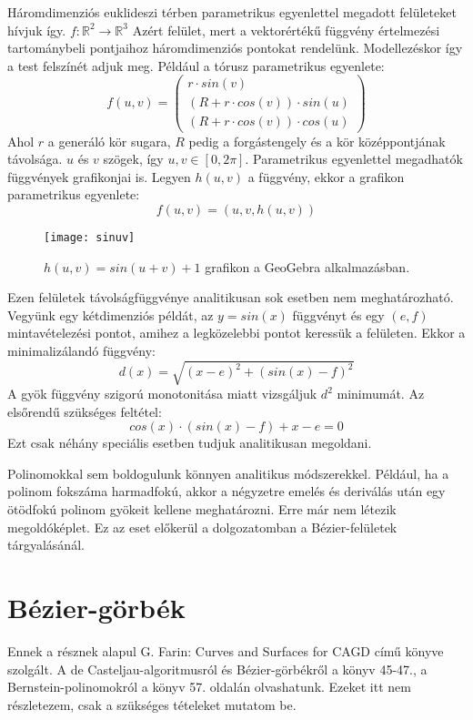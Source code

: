 Háromdimenziós euklideszi térben parametrikus egyenlettel megadott felületeket hívjuk így. $f:\mathbb{R}^2\rightarrow\mathbb{R}^3$ Azért felület, mert a vektorértékű függvény értelmezési tartománybeli pontjaihoz háromdimenziós pontokat rendelünk. Modellezéskor így a test felszínét adjuk meg.  Például a tórusz parametrikus egyenlete:
$$ f(u,v) = \begin{pmatrix} 
	r\cdot sin(v) \\ 
	(R+r\cdot cos(v))\cdot sin(u) \\ 
	(R+r\cdot cos(v))\cdot cos(u)
\end{pmatrix} $$
Ahol $r$ a generáló kör sugara, $R$ pedig a forgástengely és a kör középpontjának távolsága. $u$ és $v$ szögek, így $u,v\in[0,2\pi]$.  
Parametrikus egyenlettel megadhatók függvények grafikonjai is. Legyen $h(u,v)$ a függvény, ekkor a grafikon parametrikus egyenlete:
$$ f(u,v) = (u,v,h(u,v)) $$
\begin{figure}[H]
	\centering
	\texttt{[image: sinuv]}
	\caption{$h(u,v) = sin(u+v)+1$ grafikon a GeoGebra alkalmazásban.}
\end{figure}

Ezen felületek távolságfüggvénye analitikusan sok esetben nem meghatározható. Vegyünk egy kétdimenziós példát, az $y = sin(x)$ függvényt és egy $(e,f)$ mintavételezési pontot, amihez a legközelebbi pontot keressük a felületen. Ekkor a minimalizálandó függvény: 
$$ d(x) = \sqrt{(x-e)^2+(sin(x)-f)^2} $$
A gyök függvény szigorú monotonitása miatt vizsgáljuk $d^2$ minimumát. Az elsőrendű szükséges feltétel: 
$$ cos(x)\cdot(sin(x)-f)+x-e = 0 $$ 
Ezt csak néhány speciális esetben tudjuk analitikusan megoldani.

Polinomokkal sem boldogulunk könnyen analitikus módszerekkel. Például, ha a polinom fokszáma harmadfokú, akkor a négyzetre emelés és deriválás után egy ötödfokú polinom gyökeit kellene meghatározni. Erre már nem létezik megoldóképlet. Ez az eset előkerül a dolgozatomban a Bézier-felületek tárgyalásánál.


\section{Bézier-görbék}

Ennek a résznek alapul G. Farin: Curves and Surfaces for CAGD című könyve szolgált. \cite{farin2002curves} A de Casteljau-algoritmusról és Bézier-görbékről a könyv 45-47., a Bernstein-polinomokról a könyv 57. oldalán olvashatunk. Ezeket itt nem részletezem, csak a szükséges tételeket mutatom be. 


